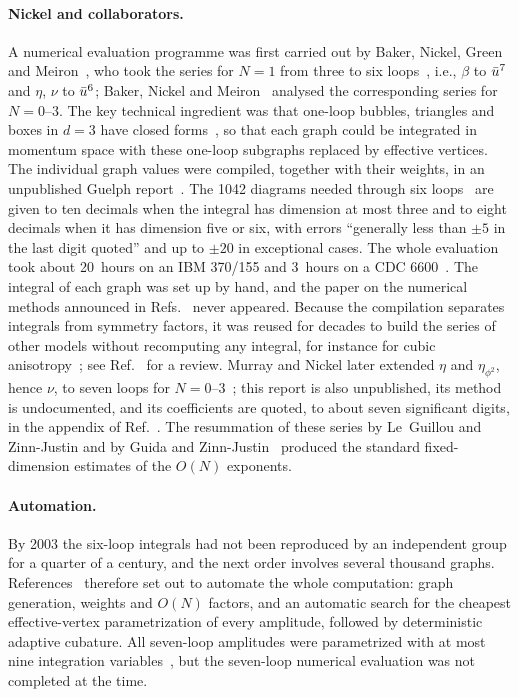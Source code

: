 \paragraph{Nickel and collaborators.}
A numerical evaluation programme was first carried out by Baker, Nickel, Green and Meiron~\cite{BNGM1976}, who took the series for
$N=1$ from three to six loops~\cite{Ribeca2003thesis}, i.e., $\beta$ to $\bar u^{7}$ and $\eta$, $\nu$ to $\bar u^{6}$;
Baker, Nickel and Meiron~\cite{BNM1978} analysed the corresponding series for $N=0$--$3$. The key technical ingredient was that one-loop bubbles, triangles and boxes in $d=3$
have closed forms~\cite{Nickel1978}, so that each graph could be integrated in momentum space with these one-loop
subgraphs replaced by effective vertices. The individual graph values were compiled, together with their weights, in
an unpublished Guelph report~\cite{NMB1977}. The 1042 diagrams needed through six loops~\cite{Ribeca2003thesis} are
given to ten decimals when the integral has dimension at most three and to eight decimals when it has dimension five
or six, with errors ``generally less than $\pm5$ in the last digit quoted'' and up to $\pm20$ in exceptional
cases. The whole evaluation took about
20~hours on an IBM 370/155 and 3~hours on a CDC 6600~\cite{NMB1977}. The integral of each graph was set up by hand, and the
paper on the numerical methods announced in Refs.~\cite{BNGM1976,NMB1977,BNM1978} never appeared. Because the compilation
separates integrals from symmetry factors, it was reused for decades to build the series of other models without
recomputing any integral, for instance for cubic anisotropy~\cite{CarmonaPelissettoVicari2000}; see
Ref.~\cite{PelissettoVicari2002} for a review. Murray and Nickel later extended $\eta$ and $\eta_{\phi^2}$, hence
$\nu$, to seven loops for $N=0$--$3$~\cite{MurrayNickel1991}; this report is also unpublished, its method is
undocumented, and its coefficients are quoted, to about seven significant digits, in the appendix of
Ref.~\cite{GuidaZinnJustin1998}. The resummation of these series by Le~Guillou and Zinn-Justin and by Guida and
Zinn-Justin~\cite{LeGuillouZinnJustin1977,LeGuillouZinnJustin1980,GuidaZinnJustin1998} produced the standard
fixed-dimension estimates of the $O(N)$ exponents.

\paragraph{Automation.}
By 2003 the six-loop integrals had not been reproduced by an independent group for a quarter of a century, and the
next order involves several thousand graphs. References~\cite{Ribeca2003thesis,GuidaRibeca2006} therefore set out to automate
the whole computation: graph generation, weights and $O(N)$ factors, and an automatic search for the cheapest
effective-vertex parametrization of every amplitude, followed by deterministic adaptive cubature. All seven-loop
amplitudes were parametrized with at most nine integration variables~\cite{Ribeca2003thesis}, but the seven-loop
numerical evaluation was not completed at the time.

